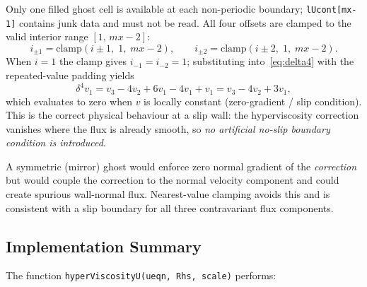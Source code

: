 \documentclass[12pt,a4paper]{article}
\begin{document}
	Only one filled ghost cell is available at each non-periodic boundary;
	\texttt{lUcont[mx-1]} contains junk data and must not be read.
	All four offsets are clamped to the valid interior range $[1,\,mx-2]$:
	\begin{equation}
		i_{\pm1} = \mathrm{clamp}(i\pm1,\;1,\;mx-2),
		\qquad
		i_{\pm2} = \mathrm{clamp}(i\pm2,\;1,\;mx-2).
		\label{eq:clamp}
	\end{equation}
	When $i = 1$ the clamp gives $i_{-1} = i_{-2} = 1$; substituting
	into~\eqref{eq:delta4} with the repeated-value padding yields
	\begin{equation}
		\delta^4 v_1 = v_3 - 4v_2 + 6v_1 - 4v_1 + v_1
		= v_3 - 4v_2 + 3v_1,
	\end{equation}
	which evaluates to zero when $v$ is locally constant
	(zero-gradient / slip condition). This is the correct physical
	behaviour at a slip wall: the hyperviscosity correction
	vanishes where the flux is already smooth, so \emph{no artificial
	no-slip boundary condition is introduced}.

	\begin{notebox}
		A symmetric (mirror) ghost would enforce zero normal gradient
		of the \emph{correction} but would couple the correction to the
		normal velocity component and could create spurious wall-normal
		flux. Nearest-value clamping avoids this and is consistent with
		a slip boundary for all three contravariant flux components.
	\end{notebox}

	\subsection{Implementation Summary}

	The function \texttt{hyperViscosityU(ueqn, Rhs, scale)} performs:
\end{document}
